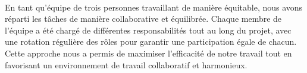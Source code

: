 \paragraph{}En tant qu'équipe de trois personnes travaillant de manière équitable, nous avons réparti les tâches de manière collaborative et équilibrée. Chaque membre de l'équipe a été chargé de différentes responsabilités tout au long du projet, avec une rotation régulière des rôles pour garantir une participation égale de chacun. Cette approche nous a permis de maximiser l'efficacité de notre travail tout en favorisant un environnement de travail collaboratif et harmonieux.